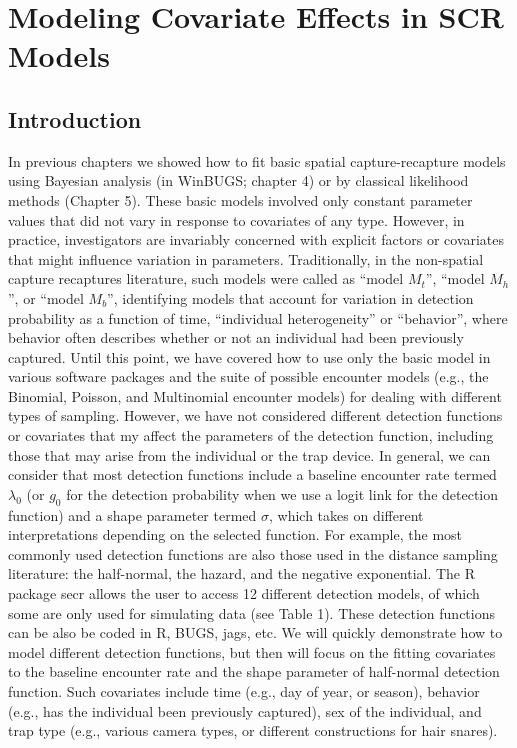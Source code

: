 \chapter{
Modeling Covariate Effects in SCR Models
}
\label{chapt.gof}

\vspace{.3in}

\section{Introduction}

In previous chapters we showed how to fit basic spatial capture-recapture models using Bayesian analysis (in WinBUGS; chapter 4) or by classical likelihood methods (Chapter 5). These basic models involved only constant parameter values that did not vary in response to covariates of any type.  However, in practice, investigators are invariably concerned with explicit factors or covariates that might influence variation in parameters. Traditionally, in the non-spatial capture recaptures literature, such models were called as ``model $M_t$'', ``model $M_h$'', or ``model $M_b$'', identifying models that account for variation in detection probability as a function of time, ``individual heterogeneity'' or ``behavior'', where behavior often describes whether or not an individual had been previously captured.   
Until this point, we have covered how to use only the basic model in various software packages and the suite of possible encounter models (e.g., the Binomial, Poisson, and Multinomial encounter models) for dealing with different types of sampling.  However, we have not considered different detection functions or covariates that my affect the parameters of the detection function, including those that may arise from the individual or the trap device.  In general, we can consider that most detection functions include a baseline encounter rate termed $\lambda_0$ (or $g_0$ for the detection probability when we use a logit link for the detection function) and a shape parameter termed $\sigma$, which takes on different interpretations depending on the selected function.  For example, the most commonly used detection functions are also those used in the distance sampling literature: the half-normal, the hazard, and the negative exponential.  The R package secr allows the user to access 12 different detection models, of which some are only used for simulating data (see Table 1).   These detection functions can be also be coded in R, BUGS, jags, etc.   We will quickly demonstrate how to model different detection functions, but then will focus on the fitting covariates to the baseline encounter rate and the shape parameter of half-normal detection function.  Such covariates include time (e.g., day of year, or season), behavior (e.g., has the individual been previously captured), sex of the individual, and trap type (e.g., various camera types, or different constructions for hair snares). 
